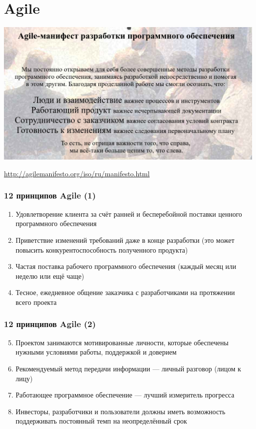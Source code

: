 \documentclass{../../slides-style}
\begin{document}
    \section{Agile}

    \begin{frame}
        \begin{center}
            \includegraphics[width=\textwidth]{agileManifesto.png}
        \end{center}
        \begin{small}
            \url{http://agilemanifesto.org/iso/ru/manifesto.html}
        \end{small}
    \end{frame}

    \begin{frame}
        \frametitle{12 принципов Agile (1)}
        \begin{enumerate}
            \item Удовлетворение клиента за счёт ранней и бесперебойной поставки ценного программного обеспечения
            \item Приветствие изменений требований даже в конце разработки (это может повысить конкурентоспособность полученного продукта)
            \item Частая поставка рабочего программного обеспечения (каждый месяц или неделю или ещё чаще)
            \item Тесное, ежедневное общение заказчика с разработчиками на протяжении всего проекта
        \end{enumerate}
    \end{frame}

    \begin{frame}
        \frametitle{12 принципов Agile (2)}
        \begin{enumerate}
            \setcounter{enumi}{4}
            \item Проектом занимаются мотивированные личности, которые обеспечены нужными условиями работы, поддержкой и доверием
            \item Рекомендуемый метод передачи информации --- личный разговор (лицом к лицу)
            \item Работающее программное обеспечение --- лучший измеритель прогресса
            \item Инвесторы, разработчики и пользователи должны иметь возможность поддерживать постоянный темп на неопределённый срок
        \end{enumerate}
    \end{frame}
\end{document}
